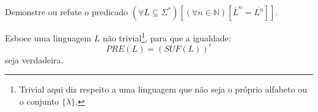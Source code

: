 \begin{questao}\label{exer:LF6}
	Demonstre ou refute o predicado $(\forall L \subseteq \Sigma^*)[(\forall n \in \mathbb{N})[\overline{L}^n = \overline{L^n}]]$.
\end{questao}

\begin{questao}\label{exer:LF7}
	Esboce uma linguagem $L$ não trivial\footnote{Trivial aqui diz respeito a uma linguagem que não seja o próprio alfabeto ou o conjunto $\{\lambda\}$.}, para que a igualdade:
	$$PRE(L) = (SUF(L))^r$$ 
	seja verdadeira.
\end{questao}
